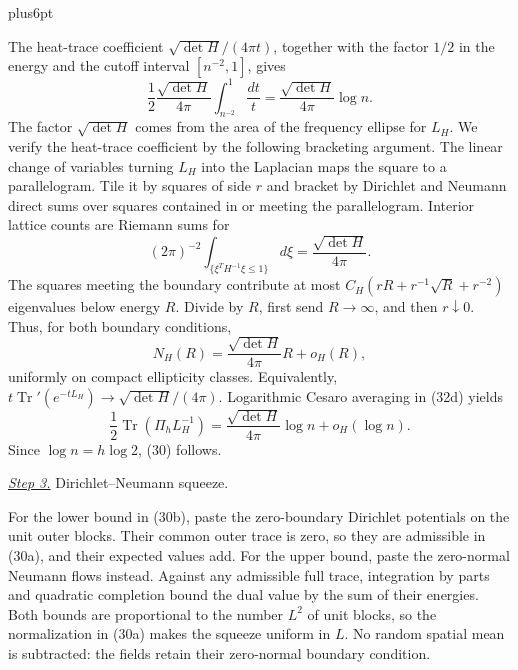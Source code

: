 \documentclass[11pt,reqno]{amsart}
\makeatletter
\theoremstyle{plain}
\theoremstyle{definition}
\theoremstyle{remark}
\renewenvironment{proof}[1][\proofname]{%
  \par
  \pushQED{\qed}%
  \normalfont
  \topsep6pt plus6pt\relax
  \trivlist
  \item[\hskip\labelsep\slshape #1\@addpunct{.}]%
  \ignorespaces
}{%
  \popQED
  \endtrivlist
  \@endpefalse
}
\DeclareRobustCommand{\qed}{%
  \leavevmode\unskip\penalty9999\hbox{}\nobreak
  \ifmmode
    \makebox[0pt][l]{\qquad\hbox{\qedsymbol}}%
  \else
    \qquad\hbox{\qedsymbol}%
  \fi
}
\renewcommand{\qedsymbol}{\rule[.47pt]{4pt}{6pt}}
\numberwithin{equation}{section}
\newcommand{\1}{\mathbf 1}
\makeatother
\begin{document}
\begin{proof}
The heat-trace coefficient $\sqrt{\det H}/(4\pi t)$, together with
the factor $1/2$ in the energy and the cutoff interval $[n^{-2},1]$,
gives
\begin{equation*}
\frac12\frac{\sqrt{\det H}}{4\pi}
\int_{n^{-2}}^1\frac{dt}{t}
=\frac{\sqrt{\det H}}{4\pi}\log n.
\end{equation*}
The factor $\sqrt{\det H}$ comes from the area of the frequency
ellipse for $L_H$.  We verify the heat-trace coefficient by the
following bracketing argument.  The linear change of variables turning
$L_H$ into the
Laplacian maps the square to a parallelogram.  Tile it by squares of side
$r$ and bracket by Dirichlet and Neumann direct sums over squares
contained in or meeting the parallelogram.  Interior lattice counts are
Riemann sums for
\begin{equation*}
(2\pi)^{-2}\int_ {\{\xi^TH^{-1}\xi\leq1\}}d\xi
=\frac{\sqrt{\det H}}{4\pi}.
\end{equation*}
The squares meeting the boundary contribute at most
$C_ H(rR+r^{-1}\sqrt R+r^{-2})$ eigenvalues below energy $R$.
Divide by $R$, first send $R\to\infty$, and then $r\downarrow0$.
Thus, for both boundary conditions,
\begin{equation}
N_ H(R)=\frac{\sqrt{\det H}}{4\pi}R+o_ H(R),
\tag{32e}
\end{equation}
uniformly on compact ellipticity classes.  Equivalently,
$t\operatorname {Tr}'(e^{-tL_ H})\to\sqrt{\det H}/(4\pi)$.
Logarithmic Cesaro averaging in (32d) yields
\begin{equation}
\frac12\operatorname {Tr}(\Pi_ hL_ H^{-1})
=\frac{\sqrt{\det H}}{4\pi}\log n+o_ H(\log n).
\tag{32}
\end{equation}
Since $\log n=h\log2$, (30) follows.

\smallskip\noindent
\underline{\textit{Step 3.}} Dirichlet--Neumann squeeze.

For the lower bound in (30b), paste the zero-boundary Dirichlet
potentials on the unit outer blocks.  Their common outer trace is
zero, so they are admissible in (30a), and their expected values add.
For the upper bound, paste the zero-normal Neumann flows instead.
Against any admissible full trace, integration by parts and quadratic
completion bound the dual value by the sum of their energies.  Both
bounds are proportional to the number $L^2$ of unit blocks, so the
normalization in (30a) makes the squeeze uniform in $L$.  No random
spatial mean is subtracted: the fields retain their zero-normal
boundary condition.


\end{proof}
\end{document}
